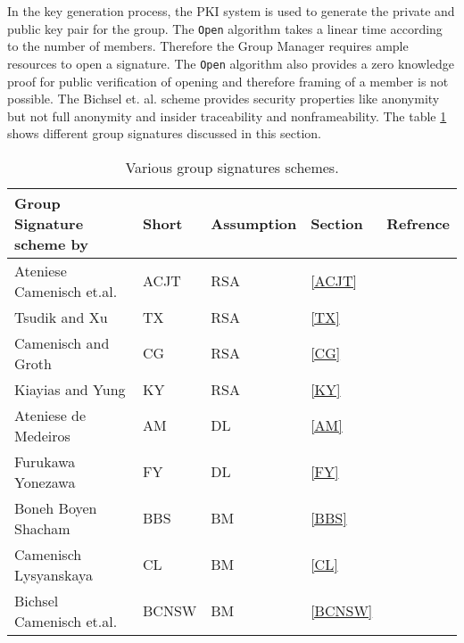 In the key generation process, the PKI system is used to generate the private and public key pair for the group. The \texttt{Open} algorithm takes a linear time according to the number of members. Therefore the Group Manager requires ample resources to open a signature. The \texttt{Open} algorithm also provides a zero knowledge proof for public verification of opening and therefore framing of a member is not possible. The Bichsel et. al. scheme provides security properties like anonymity but not full anonymity and insider traceability and nonframeability. The table \ref{table:variousgroupsignatures} shows different group signatures discussed in this section.
\begin{table}[!h]
\begin{center}
\begin{threeparttable}
\renewcommand{\arraystretch}{1.3}
\caption{Various group signatures schemes.}
\label{table:variousgroupsignatures}
\small
\begin{tabular}{| >{\arraybackslash}m{2.2in} |>{\centering\arraybackslash}m{0.55in} |>{\centering\arraybackslash}m{0.9in} |>{\centering\arraybackslash}m{0.5in} |>{\centering\arraybackslash}m{0.7in} |}
\hline 
\textbf{Group Signature scheme by} & \textbf{Short} & \textbf{Assumption} & \textbf{Section} & \textbf{Refrence}\\ 
\hline\hline
Ateniese Camenisch %
et.al.	 			& ACJT	& RSA & \ref{ACJT}& \cite{ateniese2000practical}  \\ \hline
Tsudik and Xu 		& TX	& RSA & \ref{TX}  & \cite{tsudik2003accumulating} \\ \hline
Camenisch and Groth	& CG	& RSA & \ref{CG}  & \cite{camenisch2004group}\\ \hline
Kiayias and Yung	& KY	& RSA & \ref{KY}  & \cite{kiayias2005efficient}\\ \hline
Ateniese de Medeiros& AM	& DL  & \ref{AM}  & \cite{ateniese2003efficient}\\ \hline
Furukawa Yonezawa	& FY	& DL  & \ref{FY}  & \cite{furukawa2004group}\\ \hline
Boneh Boyen Shacham	& BBS	& BM  & \ref{BBS} & \cite{boneh2004short}\\ \hline
Camenisch Lysyanskaya& CL	& BM  & \ref{CL}  & \cite{camenisch2004signature}\\ \hline
Bichsel Camenisch %
et.al.				& BCNSW	& BM  &\ref{BCNSW}& \cite{bichsel2010get}\\ \hline
\end{tabular}
\end{threeparttable}
\end{center}
\end{table}

